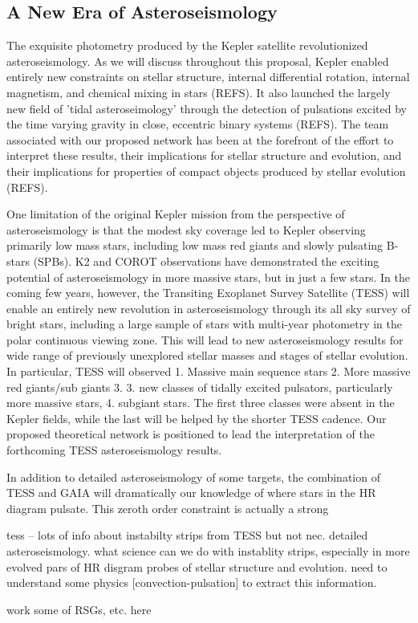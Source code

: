 {\color{blue}
\subsection{A New Era of Asteroseismology}

The exquisite photometry produced by the Kepler satellite revolutionized asteroseismology.   As we will discuss throughout this proposal, Kepler enabled entirely new constraints on stellar structure, internal differential rotation, internal magnetism, and chemical mixing in stars (REFS).  It also launched the largely new field of 'tidal asteroseimology' through the detection of pulsations excited by the time varying gravity in close, eccentric binary systems (REFS). The team associated with our proposed network has been at the forefront of the effort to interpret these results, their implications for stellar structure and evolution, and their implications for properties of compact objects produced by stellar evolution (REFS).   

One limitation of the original Kepler mission from the perspective of asteroseismology is that the modest sky coverage led to Kepler observing primarily low mass stars, including low mass red giants and slowly pulsating B-stars (SPBs).  K2 and COROT observations have demonstrated the exciting potential of asteroseismology in more massive stars, but in just a few stars.   In the coming few years, however, the Transiting Exoplanet Survey Satellite (TESS) will enable an entirely new revolution in asteroseismology through its all sky survey of bright stars, including a large sample of stars with multi-year photometry in the polar continuous viewing zone.   This will lead to new asteroseismology results for wide range of previously unexplored stellar masses and stages of stellar evolution.   In particular, TESS will observed 1.  Massive main sequence stars 2. More massive red giants/sub giants 3. 3.  new classes of tidally excited pulsators, particularly more massive stars, 4. subgiant stars.   The first three classes were absent in the Kepler fields, while the last will be helped by the shorter TESS cadence.   Our proposed theoretical network is positioned to lead the interpretation of the forthcoming TESS asteroseismology results.  

In addition to detailed asteroseismology of some targets, the combination of TESS and GAIA will dramatically our knowledge of where stars in the HR diagram pulsate.   This zeroth order constraint is actually a strong 

tess -- lots of info about instabilty strips from TESS but not nec. detailed asteroseismology.  what science can we do with instablity strips, especially in more evolved pars of HR disgram  probes of stellar structure and evolution.   need to understand some physics [convection-pulsation] to extract this information.   

work some of RSGs, etc. here




}
